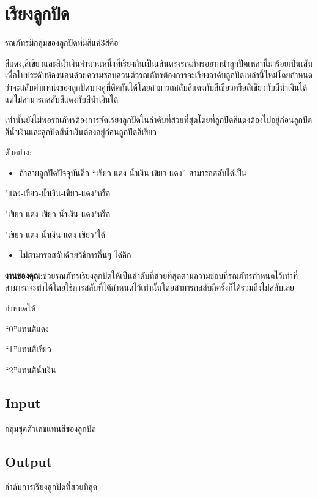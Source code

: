\documentclass{article}
\begin{document}
\section*{เรียงลูกปัด}

รณภัทรมีกลุ่มของลูกปัดที่มีสีแค่3สีคือ

สีแดง,สีเขียวและสีน้ำเงินจำนวนหนึ่งที่เรียงกันเป็นเส้นตรงรณภัทรอยากนำลูกปัดเหล่านี้มาร้อยเป็นเส้นเพื่อไปประดับห้องนอนด้วยความชอบส่วนตัวรณภัทรต้องการจะเรียงลำดับลูกปัดเหล่านี้ใหม่โดยกำหนดว่าจะสลับตำแหน่งของลูกปัดบางคู่ที่ติดกันได้โดยสามารถสลับสีแดงกับสีเขียวหรือสีเขียวกับสีน้ำเงินได้แต่ไม่สามารถสลับสีแดงกับสีน้ำเงินได้



เท่านั้นยังไม่พอรณภัทรต้องการจัดเรียงลูกปัดในลำดับที่สวยที่สุดโดยที่ลูกปัดสีแดงต้องไปอยู่ก่อนลูกปัดสีน้ำเงินและลูกปัดสีน้ำเงินต้องอยู่ก่อนลูกปัดสีเขียว



\hfill\break



ตัวอย่าง:



\begin{itemize}

\item

  ถ้าสายลูกปัดปัจจุบันคือ ``เขียว-แดง-น้ำเงิน-เขียว-แดง'' สามารถสลับได้เป็น

\end{itemize}



"แดง-เขียว-น้ำเงิน-เขียว-แดง"หรือ



"เขียว-แดง-เขียว-น้ำเงิน-แดง"หรือ



"เขียว-แดง-น้ำเงิน-แดง-เขียว"ได้



\begin{itemize}

\item

  ไม่สามารถสลับด้วยวิธีการอื่นๆ ได้อีก

\end{itemize}



\textbf{งานของคุณ:}ช่วยรณภัทรเรียงลูกปัดให้เป็นลำดับที่สวยที่สุดตามความชอบที่รณภัทรกำหนดไว้เท่าที่สามารถจะทำได้โดยใช้การสลับที่ได้กำหนดไว้เท่านั้นโดยสามารถสลับกี่ครั้งก็ได้รวมถึงไม่สลับเลย



กำหนดให้



``0''แทนสีแดง



``1''แทนสีเขียว



``2''แทนสีน้ำเงิน



\subsection*{Input}
กลุ่มชุดตัวเลขแทนสีของลูกปัด



\subsection*{Output}
ลำดับการเรียงลูกปัดที่สวยที่สุด
\end{document}
